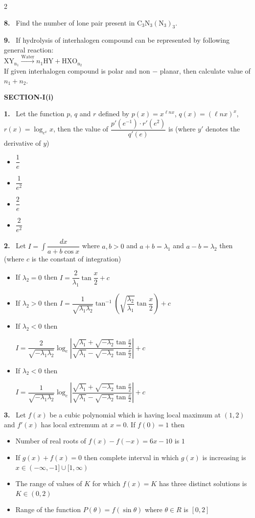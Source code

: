 \documentclass[10pt]{extarticle}
\newcommand{\partsec}[2]{\par\medskip\noindent{\large\bfseries PART-#1: #2}\par\smallskip}
\newcommand{\sect}[1]{\par\smallskip\noindent\textbf{#1}\par}
\newcommand{\qn}[1]{\par\smallskip\noindent\textbf{#1.}~}
\newenvironment{qoptions}{\begin{itemize}[leftmargin=1.8em,itemsep=1pt,topsep=2pt,label={}]}{\end{itemize}}
\newcommand{\opt}[2]{\item[(#1)] #2}
\begin{document}
\begin{multicols}{2}
\qn{8} Find the number of lone pair present in $\mathrm{C_3N_3(N_3)_3}$.
\qn{9} If hydrolysis of interhalogen compound can be represented by following general reaction:\\
$\mathrm{XY_{n_1}}\xrightarrow{\mathrm{Water}}n_1\mathrm{HY}+\mathrm{HXO_{n_2}}$\\
If given interhalogen compound is polar and non $-$ planar, then calculate value of $n_1+n_2$.
\partsec{3}{MATHEMATICS}
\sect{SECTION-I(i)}
\qn{1} Let the function $p$, $q$ and $r$ defined by $p(x)=x^{\ell nx}$, $q(x)=(\ell nx)^x$, $r(x)=\log_{e^x}x$, then the value of $\dfrac{p'(e^{-1})\cdot r'(e^2)}{q'(e)}$ is (where $y'$ denotes the derivative of $y$)
\begin{qoptions}
\opt{A}{$\dfrac1e$}
\opt{B}{$\dfrac1{e^2}$}
\opt{C}{$\dfrac2e$}
\opt{D}{$\dfrac2{e^2}$}
\end{qoptions}
\qn{2} Let $I=\displaystyle\int\dfrac{dx}{a+b\cos x}$ where $a,b>0$ and $a+b=\lambda_1$ and $a-b=\lambda_2$ then (where $c$ is the constant of integration)
\begin{qoptions}
\opt{A}{If $\lambda_2=0$ then $I=\dfrac{2}{\lambda_1}\tan\dfrac x2+c$}
\opt{B}{If $\lambda_2>0$ then $I=\dfrac{1}{\sqrt{\lambda_1\lambda_2}}\tan^{-1}\left(\sqrt{\dfrac{\lambda_2}{\lambda_1}}\tan\dfrac x2\right)+c$}
\opt{C}{If $\lambda_2<0$ then\par\noindent\hfill{\footnotesize$I=\dfrac{2}{\sqrt{-\lambda_1\lambda_2}}\log_e\left|\dfrac{\sqrt{\lambda_1}+\sqrt{-\lambda_2}\tan\frac x2}{\sqrt{\lambda_1}-\sqrt{-\lambda_2}\tan\frac x2}\right|+c$}\hfill\null\par}
\opt{D}{If $\lambda_2<0$ then\par\noindent\hfill{\footnotesize$I=\dfrac{1}{\sqrt{-\lambda_1\lambda_2}}\log_e\left|\dfrac{\sqrt{\lambda_1}+\sqrt{-\lambda_2}\tan\frac x2}{\sqrt{\lambda_1}-\sqrt{-\lambda_2}\tan\frac x2}\right|+c$}\hfill\null\par}
\end{qoptions}
\qn{3} Let $f(x)$ be a cubic polynomial which is having local maximum at $(1,2)$ and $f'(x)$ has local extremum at $x=0$. If $f(0)=1$ then
\begin{qoptions}
\opt{A}{Number of real roots of $f(x)-f(-x)=6x-10$ is $1$}
\opt{B}{If $g(x)+f(x)=0$ then complete interval in which $g(x)$ is increasing is $x\in(-\infty,-1]\cup[1,\infty)$}
\opt{C}{The range of values of $K$ for which $f(x)=K$ has three distinct solutions is $K\in(0,2)$}
\opt{D}{Range of the function $P(\theta)=f(\sin\theta)$ where $\theta\in R$ is $[0,2]$}
\end{qoptions}

\end{multicols}
\end{document}
